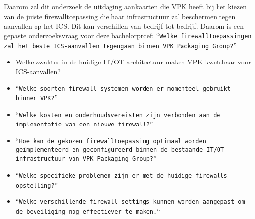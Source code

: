 \section{}%
\label{sec:onderzoeksvraag}

Daarom zal dit onderzoek de uitdaging aankaarten die VPK heeft bij het kiezen van de juiste firewalltoepassing die haar infrastructuur zal beschermen tegen aanvallen op het ICS. Dit kan verschillen van bedrijf tot bedrijf. Daarom is een gepaste onderzoeksvraag voor deze bachelorproef: ``\texttt{Welke firewalltoepassingen zal het beste ICS-aanvallen tegengaan binnen VPK Packaging Group?}''

\begin{itemize}
    \item Welke zwaktes in de huidige IT/OT architectuur maken VPK kwetsbaar voor ICS-aanvallen?
    \item ``\texttt{Welke soorten firewall systemen worden er momenteel gebruikt binnen VPK?}''
    \item ``\texttt{Welke kosten en onderhoudsvereisten zijn verbonden aan de implementatie van een nieuwe firewall?}''
    \item ``\texttt{Hoe kan de gekozen firewalltoepassing optimaal worden geïmplementeerd en geconfigureerd binnen de bestaande IT/OT-infrastructuur van VPK Packaging Group?}''
    \item ``\texttt{Welke specifieke problemen zijn er met de huidige firewalls opstelling?}''
    \item ``\texttt{Welke verschillende firewall settings kunnen worden aangepast om de beveiliging nog effectiever te maken.}``
    \end{itemize}

\section{}%
\label{sec:onderzoeksdoelstelling}

